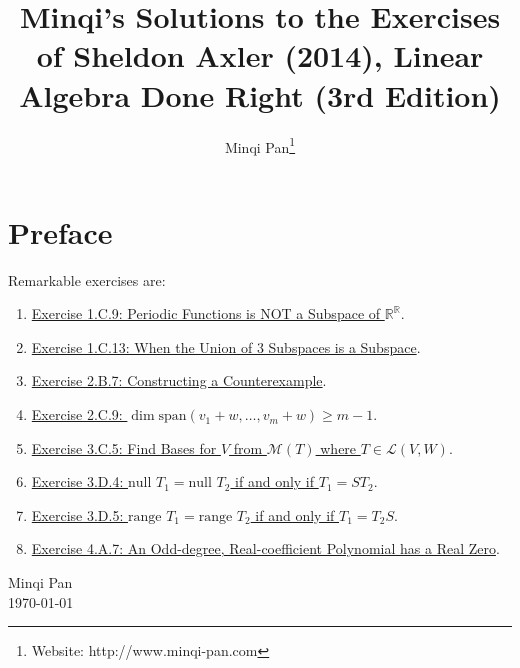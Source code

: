 \documentclass{amsbook}
\theoremstyle{definition}
\theoremstyle{remark}
\numberwithin{section}{chapter}
\numberwithin{equation}{chapter}
\begin{document}
\frontmatter

\title{Minqi's Solutions to the Exercises of Sheldon Axler (2014), Linear Algebra Done Right (3rd Edition)}

\author{Minqi Pan\footnote{Website: http://www.minqi-pan.com}}

\maketitle

\setcounter{page}{4}

\tableofcontents

\chapter*{Preface}

Remarkable exercises are:
\begin{enumerate}
\item\hyperref[Exercise 1.C.9]{Exercise 1.C.9: Periodic Functions is NOT a Subspace of $\mathbb{R}^\mathbb{R}$}.
\item\hyperref[Exercise 1.C.13]{Exercise 1.C.13: When the Union of 3 Subspaces is a Subspace}.
\item\hyperref[Exercise 2.B.7]{Exercise 2.B.7: Constructing a Counterexample}.
\item\hyperref[Exercise 2.C.9]{Exercise 2.C.9: $\dim\text{span}(v_1+w,\dots,v_m+w)\geqslant m-1$}.
\item\hyperref[Exercise 3.C.5]{Exercise 3.C.5: Find Bases for $V$ from $\mathcal{M}(T)$ where $T\in\mathcal{L}(V,W)$}.
\item\hyperref[Exercise 3.D.4]{Exercise 3.D.4: $\text{null }T_1=\text{null }T_2$ if and only if $T_1=ST_2$}.
\item\hyperref[Exercise 3.D.5]{Exercise 3.D.5: $\text{range }T_1=\text{range }T_2$ if and only if $T_1=T_2S$}.
\item\hyperref[Exercise 4.A.7]{Exercise 4.A.7: An Odd-degree, Real-coefficient Polynomial has a Real Zero}.
\end{enumerate}

\medskip
\begin{flushright}
Minqi Pan\\
\today
\end{flushright}

\mainmatter





\backmatter


\end{document}
